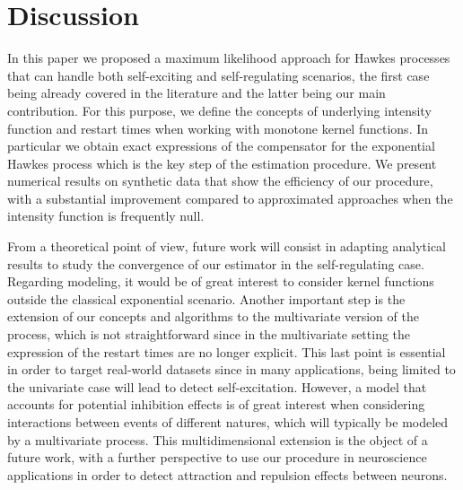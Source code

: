 \section{Discussion}

In this paper we proposed a maximum likelihood approach for Hawkes processes that can handle both self-exciting and self-regulating scenarios, the first case being already covered in the literature and the latter being our main contribution. For this purpose, we define the concepts of underlying intensity function and restart times when working with monotone kernel functions. In particular we obtain exact expressions of the compensator for the exponential Hawkes process which is the key step of the estimation procedure.
We present numerical results on synthetic data that show the efficiency of our procedure, with a substantial improvement compared to approximated approaches when the intensity function is frequently null.

From a theoretical point of view, future work will consist in adapting analytical results to study the convergence of our estimator in the self-regulating case. Regarding modeling, it would be of great interest to consider kernel functions outside the classical exponential scenario.
Another important step is the extension of our concepts and algorithms to the multivariate version of the process, which is not straightforward since in the multivariate setting the expression of the restart times are no longer explicit.
This last point is essential in order to target real-world datasets since in many applications, being limited to the univariate case will lead to detect self-excitation. However, a model that accounts for potential inhibition effects is of great interest when considering interactions between events of different natures, which will typically be modeled by a multivariate process. This multidimensional extension is the object of a future work, with a further perspective to use our procedure in neuroscience applications in order to detect attraction and repulsion effects between neurons.

